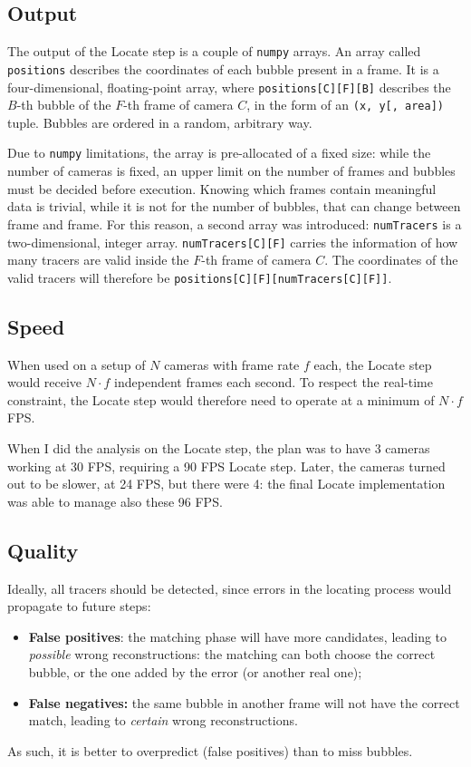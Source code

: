 \subsection{Output}

The output of the Locate step is a couple of \texttt{numpy} arrays.
An array called \texttt{positions} describes the coordinates of each bubble present in a frame. It is a four-dimensional, floating-point array, where \texttt{positions[C][F][B]} describes the $B$-th bubble of the $F$-th frame of camera $C$, in the form of an \texttt{(x, y[, area])} tuple.
Bubbles are ordered in a random, arbitrary way.

Due to \texttt{numpy} limitations, the array is pre-allocated of a fixed size: while the number of cameras is fixed, an upper limit on the number of frames and bubbles must be decided before execution.
Knowing which frames contain meaningful data is trivial, while it is not for the number of bubbles, that can change between frame and frame.
For this reason, a second array was introduced: \texttt{numTracers} is a two-dimensional, integer array.
\texttt{numTracers[C][F]} carries the information of how many tracers are valid inside the $F$-th frame of camera $C$.
The coordinates of the valid tracers will therefore be \texttt{positions[C][F][numTracers[C][F]]}.

\subsection{Speed}

When used on a setup of $N$ cameras with frame rate $f$ each, the Locate step would receive $N{\cdot}f$ independent frames each second.
To respect the real-time constraint, the Locate step would therefore need to operate at a minimum of $N{\cdot}f$ FPS.

When I did the analysis on the Locate step, the plan was to have 3 cameras working at 30 FPS, requiring a 90 FPS Locate step.
Later, the cameras turned out to be slower, at 24 FPS, but there were 4: the final Locate implementation was able to manage also these 96 FPS.

\subsection{Quality}

Ideally, all tracers should be detected, since errors in the locating process would propagate to future steps:
\begin{itemize}
	\itemsep 0em
	\item \textbf{False positives}: the matching phase will have more candidates, leading to \textit{possible} wrong reconstructions: the matching can both choose the correct bubble, or the one added by the error (or another real one);
	\item \textbf{False negatives:} the same bubble in another frame will not have the correct match, leading to \textit{certain} wrong reconstructions.
\end{itemize}
As such, it is better to overpredict (false positives) than to miss bubbles.

